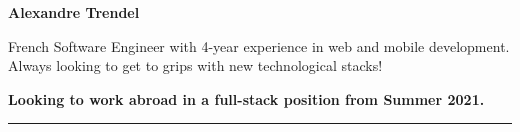 \documentclass{cv}
\begin{document}
\pagestyle{empty}

\noindent\begin{minipage}[c]{\textwidth}
	\large

	\textbf{Alexandre Trendel}

	\smallskip

	French Software Engineer with 4-year experience in web and mobile development. Always looking to get to grips with new technological stacks!

	\smallskip

	\textbf{Looking to work abroad in a full-stack position from Summer 2021.}

	\color{solred}\rule{2cm}{1pt}

\end{minipage}

\vspace{1cm}
\end{document}
